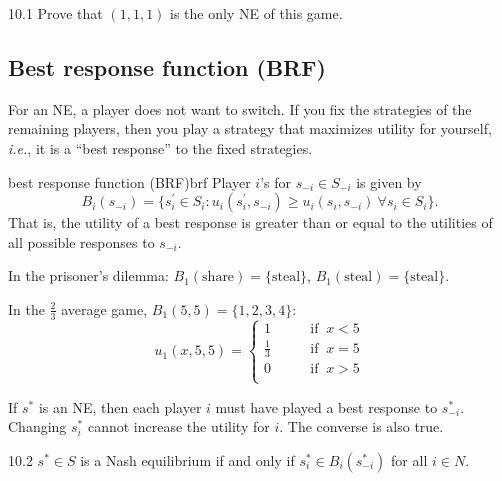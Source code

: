 \documentclass[12pt,letterpaper]{report}
\begin{document}
\begin{exer}{}{10.1}
  Prove that $(1, 1, 1)$ is the only NE of this game.
\end{exer}

\pagebreak
\subsection{Best response function (BRF)}

For an NE, a player does not want to switch.
If you fix the strategies of the remaining players, then you play a strategy that maximizes utility
for yourself, \emph{i.e.}, it is a ``best response'' to the fixed strategies.

\begin{defn}{best response function (BRF)}{brf}
  Player $i$'s  for $s_{-i} \in S_{-i}$ is given by
  \[
    B_i(s_{-i}) = \{ s_i^{\prime} \in S_i :
      u_i(s_i^{\prime}, s_{-i}) \geq u_i(s_i, s_{-i}) \ \forall s_i \in S_i
    \}.
  \]
  That is, the utility of a best response is greater than or equal to the utilities of all possible
  responses to $s_{-i}$.
\end{defn}

\begin{ex}
  In the prisoner's dilemma: $B_1(\text{share}) = \{ \text{steal} \}$,
  $B_1(\text{steal}) = \{ \text{steal} \}$.
\end{ex}

\begin{ex}
  In the $\frac{2}{3}$ average game, $B_1(5, 5) = \{ 1, 2, 3, 4 \}$:
  \[
    u_1(x, 5, 5) = \begin{cases}
      1 \qquad &\text{if } \ x < 5 \\
      \frac{1}{3} \qquad &\text{if } \ x = 5 \\
      0 \qquad &\text{if } \ x > 5 \\
    \end{cases}
  \]
\end{ex}

If $s^*$ is an NE, then each player $i$ must have played a best response to $s_{-i}^*$.
Changing $s_i^*$ cannot increase the utility for $i$.
The converse is also true.

\begin{lem}{}{10.2}
  $s^* \in S$ is a Nash equilibrium if and only if $s_i^* \in B_i(s_{-i}^*)$ for all $i \in N$.
\end{lem}
\end{document}
